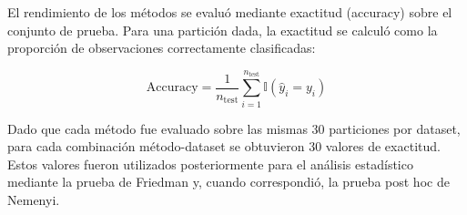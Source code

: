 El rendimiento de los métodos se evaluó mediante exactitud (accuracy) sobre el conjunto de prueba. Para una partición dada, la exactitud se calculó como la proporción de observaciones correctamente clasificadas:

\begin{equation}
	\text{Accuracy} = \frac{1}{n_{\text{test}}} \sum_{i=1}^{n_{\text{test}}} \mathbb{I}(\hat{y}_i = y_i)
	\label{eq:EM22}
\end{equation}

Dado que cada método fue evaluado sobre las mismas 30 particiones por dataset, para cada combinación método-dataset se obtuvieron 30 valores de exactitud. Estos valores fueron utilizados posteriormente para el análisis estadístico mediante la prueba de Friedman y, cuando correspondió, la prueba post hoc de Nemenyi.

